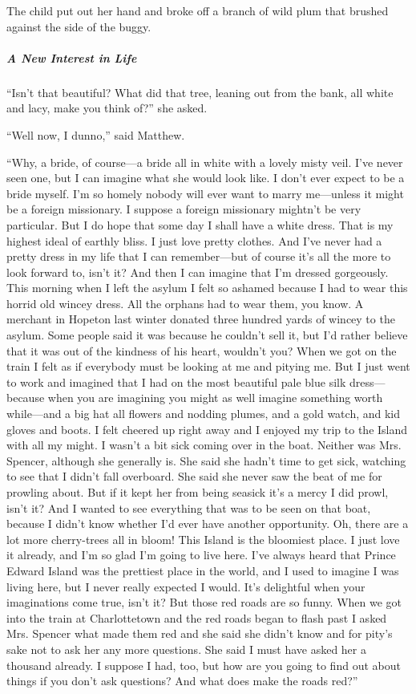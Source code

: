 \documentclass{article}
\begin{document}
The child put out her hand and broke off a branch of wild plum that brushed against the side of the buggy.

\subparagraph{A New Interest in Life}
``Isn't that beautiful? What did that tree, leaning out from the bank, all white and lacy, make you think of?'' she asked.

``Well now, I dunno,'' said Matthew.

``Why, a bride, of course---a bride all in white with a lovely misty veil. I've never seen one, but I can imagine what she would look like. I don't ever expect to be a bride myself. I'm so homely nobody will ever want to marry me---unless it might be a foreign missionary. I suppose a foreign missionary mightn't be very particular. But I do hope that some day I shall have a white dress. That is my highest ideal of earthly bliss. I just love pretty clothes. And I've never had a pretty dress in my life that I can remember---but of course it's all the more to look forward to, isn't it? And then I can imagine that I'm dressed gorgeously. This morning when I left the asylum I felt so ashamed because I had to wear this horrid old wincey dress. All the orphans had to wear them, you know. A merchant in Hopeton last winter donated three hundred yards of wincey to the asylum. Some people said it was because he couldn't sell it, but I'd rather believe that it was out of the kindness of his heart, wouldn't you? When we got on the train I felt as if everybody must be looking at me and pitying me. But I just went to work and imagined that I had on the most beautiful pale blue silk dress---because when you are imagining you might as well imagine something worth while---and a big hat all flowers and nodding plumes, and a gold watch, and kid gloves and boots. I felt cheered up right away and I enjoyed my trip to the Island with all my might. I wasn't a bit sick coming over in the boat. Neither was Mrs. Spencer, although she generally is. She said she hadn't time to get sick, watching to see that I didn't fall overboard. She said she never saw the beat of me for prowling about. But if it kept her from being seasick it's a mercy I did prowl, isn't it? And I wanted to see everything that was to be seen on that boat, because I didn't know whether I'd ever have another opportunity. Oh, there are a lot more cherry-trees all in bloom! This Island is the bloomiest place. I just love it already, and I'm so glad I'm going to live here. I've always heard that Prince Edward Island was the prettiest place in the world, and I used to imagine I was living here, but I never really expected I would. It's delightful when your imaginations come true, isn't it? But those red roads are so funny. When we got into the train at Charlottetown and the red roads began to flash past I asked Mrs. Spencer what made them red and she said she didn't know and for pity's sake not to ask her any more questions. She said I must have asked her a thousand already. I suppose I had, too, but how are you going to find out about things if you don't ask questions? And what does make the roads red?''
\end{document}
